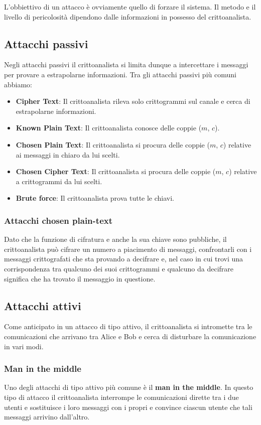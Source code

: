 L'obbiettivo di un attacco \`e ovviamente quello di forzare il sistema. Il metodo e il livello di pericolosit\`a
dipendono dalle informazioni in possesso del crittoanalista.

\subsection{Attacchi passivi}
Negli attacchi passivi il crittoanalista si limita dunque a intercettare i messaggi per provare a estrapolarne
informazioni. Tra gli attacchi passivi pi\`u comuni abbiamo:
\begin{itemize}
	\item \textbf{Cipher Text}: Il crittoanalista rileva solo crittogrammi sul canale e cerca di estrapolarne informazioni.
	\item \textbf{Known Plain Text}: Il crittoanalista conosce delle coppie ($m$, $c$).
	\item \textbf{Chosen Plain Text}: Il crittoanalista si procura delle coppie ($m$, $c$) relative
	      ai messaggi in chiaro da lui scelti.
	\item \textbf{Chosen Cipher Text}: Il crittoanalista si procura delle coppie ($m$, $c$) relative a crittogrammi
	      da lui scelti.
	\item \textbf{Brute force}: Il crittoanalista prova tutte le chiavi.
\end{itemize}

\subsubsection{Attacchi chosen plain-text}
Dato che la funzione di cifratura e anche la sua chiave sono pubbliche, il crittoanalista pu\`o cifrare un numero a
piacimento di messaggi, confrontarli con i messaggi crittografati che sta provando a decifrare e, nel caso in cui
trovi una corrispondenza tra qualcuno dei suoi crittogrammi e qualcuno da decifrare significa che ha trovato il
messaggio in questione.

\subsection{Attacchi attivi}
Come anticipato in un attacco di tipo attivo, il crittoanalista si intromette tra le comunicazioni che arrivano tra
Alice e Bob e cerca di disturbare la comunicazione in vari modi.

\subsubsection{Man in the middle}
Uno degli attacchi di tipo attivo pi\`u comune \`e il \textbf{man in the middle}. In questo tipo di attacco il
crittoanalista interrompe le comunicazioni dirette tra i due utenti e sostituisce i loro messaggi con i propri e convince
ciascun utente che tali messaggi arrivino dall'altro.
